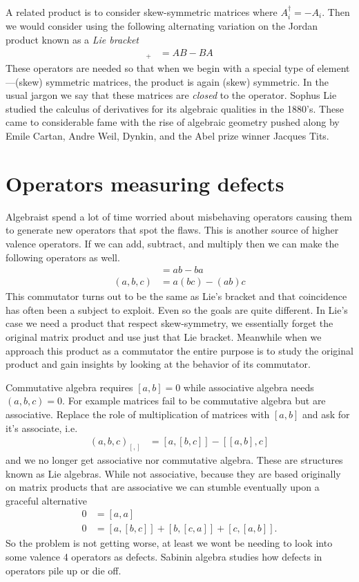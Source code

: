 A related product is to consider 
skew-symmetric matrices where $A_i^{\dagger}=-A_i$.  Then we would consider using the following 
alternating variation on the Jordan product known as a \emph{Lie bracket}
\begin{align*}
    [A,B]_+ & = AB-BA
\end{align*}
These operators are needed so that when we begin with a special type of
element---(skew) symmetric matrices, the product is again (skew) symmetric.
In the usual jargon we say that these matrices are \emph{closed} to the operator.
Sophus Lie studied the calculus of derivatives for its algebraic 
qualities in the 1880's.  These came to considerable fame with the rise of algebraic 
geometry pushed along by Emile Cartan, Andre Weil, Dynkin, and the Abel prize winner Jacques Tits. 

\section{Operators measuring defects}
Algebraist spend a lot of time worried about misbehaving operators 
causing them to generate new operators that spot the flaws.  This is another 
source of higher valence operators. If 
we can add, subtract, and multiply then we can make the following operators as well.
\begin{align*}
    [a,b] & = ab-ba \tag{Commutator}\\
    (a,b,c) & = a(bc)-(ab)c \tag{Associator}
\end{align*}
This commutator turns out to be the same as Lie's bracket and that coincidence 
has often been a subject to exploit.  Even so the goals are quite different. 
In Lie's case we need a product that respect skew-symmetry, we essentially forget 
the original matrix product and use just that Lie bracket.  Meanwhile when we 
approach this product as a commutator the entire purpose is to study the original 
product and gain insights by looking at the behavior of its commutator.

Commutative algebra requires $[a,b]=0$ while associative algebra needs $(a,b,c)=0$.
For example matrices fail to be commutative algebra but are associative.
Replace the role of multiplication of matrices with $[a,b]$ and ask for it's 
associate, i.e.
\begin{align*}
    (a,b,c)_{[,]} & = [a,[b,c]]-[[a,b],c]
\end{align*}
and we no longer get associative nor commutative algebra.  These are structures 
known as Lie algebras.  While not associative, because they are based originally 
on matrix products that are associative we can stumble eventually upon a 
graceful alternative
\begin{align*}
    0 & = [a,a] \tag{Alternating}\\
    0 & = [a,[b,c]]+[b,[c,a]]+[c,[a,b]].    
    \tag{Jacobi}
\end{align*}
So the problem is not getting worse, at least we wont be needing 
to look into some  valence 4 operators as defects.  Sabinin algebra 
studies how defects in operators pile up or die off.



